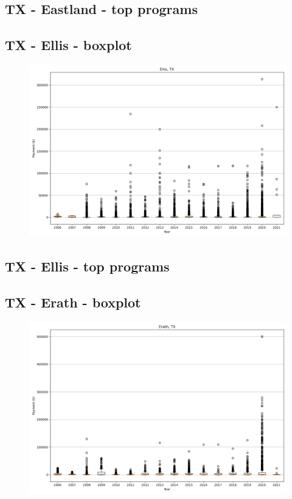 \subsection*{TX - Eastland - top programs}

\newpage
\subsection*{TX - Ellis - boxplot}
\begin{figure}[h]
\centering
\includegraphics[width=7in]{../output/boxplots/counties/Ellis-TX_boxplot.png}
\end{figure}


\subsection*{TX - Ellis - top programs}

\newpage
\subsection*{TX - Erath - boxplot}
\begin{figure}[h]
\centering
\includegraphics[width=7in]{../output/boxplots/counties/Erath-TX_boxplot.png}
\end{figure}


